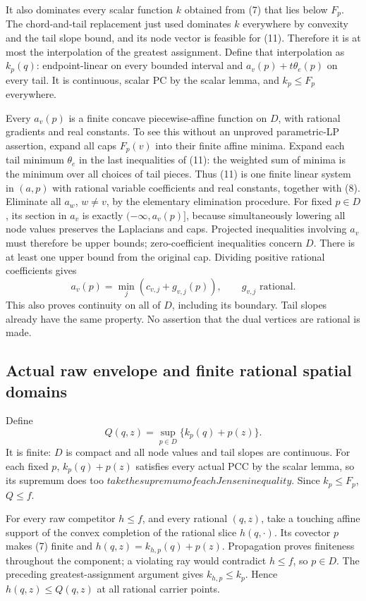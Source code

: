 \documentclass[
  11pt,
]{article}
\begin{document}
It also dominates every scalar function \(k\) obtained from (7) that
lies below \(F_p\). The chord-and-tail replacement just used dominates
\(k\) everywhere by convexity and the tail slope bound, and its node
vector is feasible for (11). Therefore it is at most the interpolation
of the greatest assignment. Define that interpolation as \(k_p(q)\):
endpoint-linear on every bounded interval and \(a_v(p)+t\theta_e(p)\) on
every tail. It is continuous, scalar PC by the scalar lemma, and
\(k_p\leq F_p\) everywhere.

Every \(a_v(p)\) is a finite concave piecewise-affine function on \(D\),
with rational gradients and real constants. To see this without an
unproved parametric-LP assertion, expand all caps \(F_p(v)\) into their
finite affine minima. Expand each tail minimum \(\theta_e\) in the last
inequalities of (11): the weighted sum of minima is the minimum over all
choices of tail pieces. Thus (11) is one finite linear system in
\((a,p)\) with rational variable coefficients and real constants,
together with (8). Eliminate all \(a_w\), \(w\ne v\), by the elementary
elimination procedure. For fixed \(p\in D\), its section in \(a_v\) is
exactly \((-\infty,a_v(p)]\), because simultaneously lowering all node
values preserves the Laplacians and caps. Projected inequalities
involving \(a_v\) must therefore be upper bounds; zero-coefficient
inequalities concern \(D\). There is at least one upper bound from the
original cap. Dividing positive rational coefficients gives \[
 a_v(p)=\min_j(c_{v,j}+g_{v,j}(p)),\qquad g_{v,j}\text{ rational}.             \tag{12}
\] This also proves continuity on all of \(D\), including its boundary.
Tail slopes already have the same property. No assertion that the dual
vertices are rational is made.

\subsection{Actual raw envelope and finite rational spatial
domains}\label{actual-raw-envelope-and-finite-rational-spatial-domains}

Define \[
 Q(q,z)=\sup_{p\in D}\{k_p(q)+p(z)\}.                                    \tag{13}
\] It is finite: \(D\) is compact and all node values and tail slopes
are continuous. For each fixed \(p\), \(k_p(q)+p(z)\) satisfies every
actual PCC by the scalar lemma, so its supremum does too
\(take the supremum of each Jensen inequality\). Since \(k_p\leq F_p\),
\(Q\leq f\).

For every raw competitor \(h\leq f\), and every rational \((q,z)\), take
a touching affine support of the convex completion of the rational slice
\(h(q,\cdot)\). Its covector \(p\) makes (7) finite and
\(h(q,z)=k_{h,p}(q)+p(z)\). Propagation proves finiteness throughout the
component; a violating ray would contradict \(h\leq f\), so \(p\in D\).
The preceding greatest-assignment argument gives \(k_{h,p}\leq k_p\).
Hence \(h(q,z)\leq Q(q,z)\) at all rational carrier points.
\end{document}
